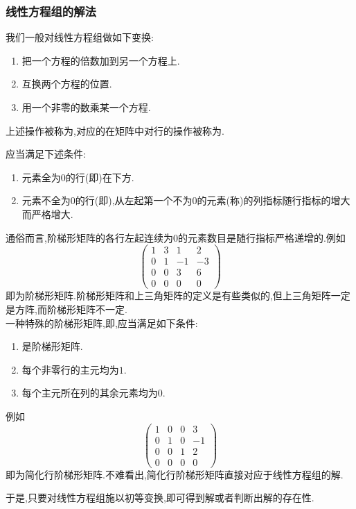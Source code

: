 \documentclass{ctexart}
\begin{document}
\subsubsection{线性方程组的解法}
\begin{theorem}[解线性方程组的操作]
    我们一般对线性方程组做如下变换:
    \begin{enumerate}[label=\arabic*.,topsep=0pt,parsep=0pt,itemsep=0pt,partopsep=0pt]
        \item 把一个方程的倍数加到另一个方程上.
        \item 互换两个方程的位置.
        \item 用一个非零的数乘某一个方程.
    \end{enumerate}
    上述操作被称为,对应的在矩阵中对行的操作被称为.
\end{theorem}
\begin{definition}[阶梯形矩阵和简化行阶梯形矩阵]
    应当满足下述条件:
    \begin{enumerate}[label=\arabic*.,topsep=0pt,parsep=0pt,itemsep=0pt,partopsep=0pt]
        \item 元素全为$0$的行(即)在下方.
        \item 元素不全为$0$的行(即),从左起第一个不为$0$的元素(称)的列指标随行指标的增大而严格增大.
    \end{enumerate}
    通俗而言,阶梯形矩阵的各行左起连续为$0$的元素数目是随行指标严格递增的.例如
    \[\begin{pmatrix}
        1&3&1&2\\0&1&-1&-3\\0&0&3&6\\0&0&0&0
    \end{pmatrix}\]
    即为阶梯形矩阵.阶梯形矩阵和上三角矩阵的定义是有些类似的,但上三角矩阵一定是方阵,而阶梯形矩阵不一定.\\
    一种特殊的阶梯形矩阵,即,应当满足如下条件:
    \begin{enumerate}[label=\arabic*.,topsep=0pt,parsep=0pt,itemsep=0pt,partopsep=0pt]
        \item 是阶梯形矩阵.
        \item 每个非零行的主元均为$1$.
        \item 每个主元所在列的其余元素均为$0$.
    \end{enumerate}
    例如
    \[\begin{pmatrix}
        1&0&0&3\\0&1&0&-1\\0&0&1&2\\0&0&0&0
    \end{pmatrix}\]
    即为简化行阶梯形矩阵.不难看出,简化行阶梯形矩阵直接对应于线性方程组的解.
\end{definition}
于是,只要对线性方程组施以初等变换,即可得到解或者判断出解的存在性.
\end{document}
